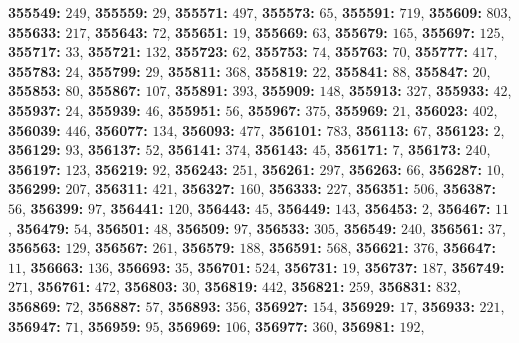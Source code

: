 \textsf{\bfseries 355549:} $249$, \textsf{\bfseries 355559:} $29$, \textsf{\bfseries 355571:} $497$, \textsf{\bfseries 355573:} $65$, \textsf{\bfseries 355591:} $719$, \textsf{\bfseries 355609:} $803$, \textsf{\bfseries 355633:} $217$, \textsf{\bfseries 355643:} $72$, \textsf{\bfseries 355651:} $19$, \textsf{\bfseries 355669:} $63$, \textsf{\bfseries 355679:} $165$, \textsf{\bfseries 355697:} $125$, \textsf{\bfseries 355717:} $33$, \textsf{\bfseries 355721:} $132$, \textsf{\bfseries 355723:} $62$, \textsf{\bfseries 355753:} $74$, \textsf{\bfseries 355763:} $70$, \textsf{\bfseries 355777:} $417$, \textsf{\bfseries 355783:} $24$, \textsf{\bfseries 355799:} $29$, \textsf{\bfseries 355811:} $368$, \textsf{\bfseries 355819:} $22$, \textsf{\bfseries 355841:} $88$, \textsf{\bfseries 355847:} $20$, \textsf{\bfseries 355853:} $80$, \textsf{\bfseries 355867:} $107$, \textsf{\bfseries 355891:} $393$, \textsf{\bfseries 355909:} $148$, \textsf{\bfseries 355913:} $327$, \textsf{\bfseries 355933:} $42$, \textsf{\bfseries 355937:} $24$, \textsf{\bfseries 355939:} $46$, \textsf{\bfseries 355951:} $56$, \textsf{\bfseries 355967:} $375$, \textsf{\bfseries 355969:} $21$, \textsf{\bfseries 356023:} $402$, \textsf{\bfseries 356039:} $446$, \textsf{\bfseries 356077:} $134$, \textsf{\bfseries 356093:} $477$, \textsf{\bfseries 356101:} $783$, \textsf{\bfseries 356113:} $67$, \textsf{\bfseries 356123:} $2$, \textsf{\bfseries 356129:} $93$, \textsf{\bfseries 356137:} $52$, \textsf{\bfseries 356141:} $374$, \textsf{\bfseries 356143:} $45$, \textsf{\bfseries 356171:} $7$, \textsf{\bfseries 356173:} $240$, \textsf{\bfseries 356197:} $123$, \textsf{\bfseries 356219:} $92$, \textsf{\bfseries 356243:} $251$, \textsf{\bfseries 356261:} $297$, \textsf{\bfseries 356263:} $66$, \textsf{\bfseries 356287:} $10$, \textsf{\bfseries 356299:} $207$, \textsf{\bfseries 356311:} $421$, \textsf{\bfseries 356327:} $160$, \textsf{\bfseries 356333:} $227$, \textsf{\bfseries 356351:} $506$, \textsf{\bfseries 356387:} $56$, \textsf{\bfseries 356399:} $97$, \textsf{\bfseries 356441:} $120$, \textsf{\bfseries 356443:} $45$, \textsf{\bfseries 356449:} $143$, \textsf{\bfseries 356453:} $2$, \textsf{\bfseries 356467:} $11$, \textsf{\bfseries 356479:} $54$, \textsf{\bfseries 356501:} $48$, \textsf{\bfseries 356509:} $97$, \textsf{\bfseries 356533:} $305$, \textsf{\bfseries 356549:} $240$, \textsf{\bfseries 356561:} $37$, \textsf{\bfseries 356563:} $129$, \textsf{\bfseries 356567:} $261$, \textsf{\bfseries 356579:} $188$, \textsf{\bfseries 356591:} $568$, \textsf{\bfseries 356621:} $376$, \textsf{\bfseries 356647:} $11$, \textsf{\bfseries 356663:} $136$, \textsf{\bfseries 356693:} $35$, \textsf{\bfseries 356701:} $524$, \textsf{\bfseries 356731:} $19$, \textsf{\bfseries 356737:} $187$, \textsf{\bfseries 356749:} $271$, \textsf{\bfseries 356761:} $472$, \textsf{\bfseries 356803:} $30$, \textsf{\bfseries 356819:} $442$, \textsf{\bfseries 356821:} $259$, \textsf{\bfseries 356831:} $832$, \textsf{\bfseries 356869:} $72$, \textsf{\bfseries 356887:} $57$, \textsf{\bfseries 356893:} $356$, \textsf{\bfseries 356927:} $154$, \textsf{\bfseries 356929:} $17$, \textsf{\bfseries 356933:} $221$, \textsf{\bfseries 356947:} $71$, \textsf{\bfseries 356959:} $95$, \textsf{\bfseries 356969:} $106$, \textsf{\bfseries 356977:} $360$, \textsf{\bfseries 356981:} $192$, 
